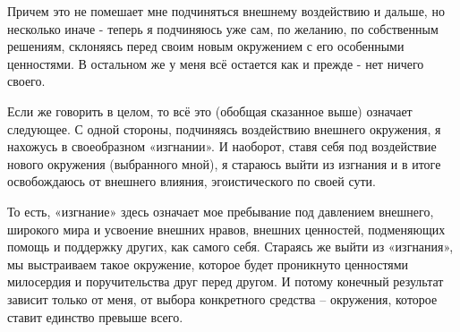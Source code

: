 Причем это не помешает мне подчиняться внешнему воздействию и дальше, но
несколько иначе - теперь я подчиняюсь уже сам, по желанию, по собственным
решениям, склоняясь перед своим новым окружением с его особенными ценностями. В
остальном же у меня всё остается как и прежде -  нет ничего своего.

Если же говорить в целом, то всё это (обобщая сказанное выше) означает
следующее. С одной стороны, подчиняясь воздействию внешнего окружения, я
нахожусь в своеобразном «изгнании». И наоборот, ставя себя под воздействие
нового окружения (выбранного мной), я стараюсь выйти из изгнания и в итоге
освобождаюсь от внешнего влияния, эгоистического по своей сути. 

То есть, «изгнание» здесь означает мое пребывание под давлением внешнего,
широкого мира и усвоение внешних нравов, внешних ценностей, подменяющих помощь
и поддержку других, как самого себя. Стараясь же выйти из «изгнания», мы
выстраиваем такое окружение, которое будет проникнуто ценностями милосердия и
поручительства друг перед другом. И потому конечный результат зависит только от
меня, от выбора конкретного средства – окружения, которое ставит единство
превыше всего.
